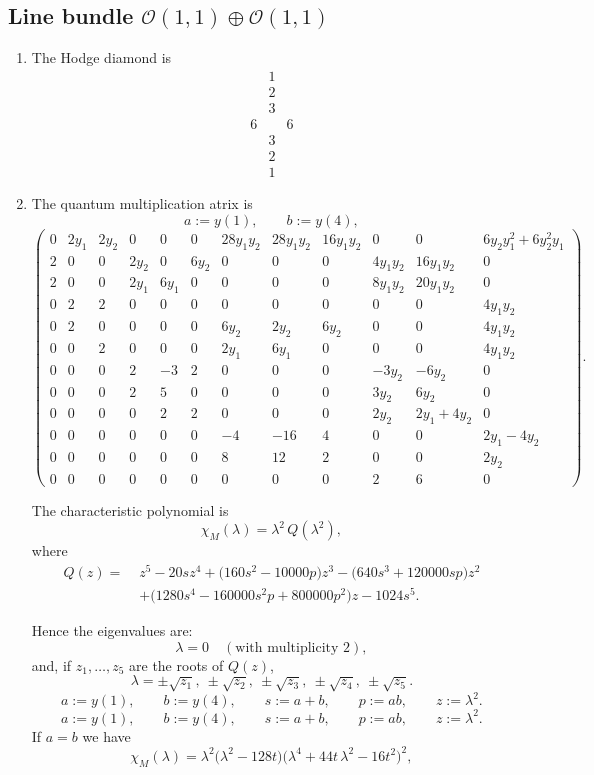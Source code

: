 \documentclass[11pt]{amsart}
\newcounter{num}[section] %
\begin{document}
\subsection{Line bundle $\mathcal{O}(1,1) \oplus \mathcal{O}(1,1)$}
\begin{enumerate}
    \item [1)] The Hodge diamond is
    \[
        \begin{array}{ccc}
             &1&  \\
             &2&\\
             &3&\\
             6&&6\\
             &3&\\
             &2&\\
             &1&
        \end{array}
    \]
\item[2)] The quantum multiplication atrix is
\[
a:=y(1),\qquad b:=y(4),
\]
\[
\begin{pmatrix}
0&2y_1&2y_2&0&0&0&28y_1 y_2&28y_1 y_2&16y_1 y_2&0&0&6y_2 y_1^2+6y_2^2 y_1\\
2&0&0&2y_2&0&6y_2&0&0&0&4y_1 y_2&16y_1 y_2&0\\
2&0&0&2y_1&6y_1&0&0&0&0&8y_1 y_2&20y_1 y_2&0\\
0&2&2&0&0&0&0&0&0&0&0&4y_1 y_2\\
0&2&0&0&0&0&6 y_2&2y_2&6y_2&0&0&4y_1 y_2\\
0&0&2&0&0&0&2 y_1&6 y_1&0&0&0&4y_1 y_2\\
0&0&0&2&-3&2&0&0&0&-3y_2&-6y_2&0\\
0&0&0&2&5&0&0&0&0&3y_2&6y_2&0\\
0&0&0&0&2&2&0&0&0&2y_2&2y_1+4y_2&0\\
0&0&0&0&0&0&-4&-16&4&0&0&2y_1-4y_2\\
0&0&0&0&0&0&8&12&2&0&0&2y_2\\
0&0&0&0&0&0&0&0&0&2&6&0
\end{pmatrix}.
\]

The characteristic polynomial is
\[
\chi_M(\lambda)=\lambda^2\,Q(\lambda^2),
\]
where
\[
\begin{aligned}
Q(z)=\;&z^5-20sz^4+\bigl(160s^2-10000p\bigr)z^3
-\bigl(640s^3+120000sp\bigr)z^2\\
&+\bigl(1280s^4-160000s^2p+800000p^2\bigr)z-1024s^5.
\end{aligned}
\]

Hence the eigenvalues are:
\[
\lambda=0 \quad (\text{with multiplicity }2),
\]
and, if \(z_1,\dots,z_5\) are the roots of \(Q(z)\),
\[
\lambda=\pm \sqrt{z_1},\ \pm \sqrt{z_2},\ \pm \sqrt{z_3},\ \pm \sqrt{z_4},\ \pm \sqrt{z_5}.
\]
\[
a:=y(1),\qquad b:=y(4),\qquad s:=a+b,\qquad p:=ab,\qquad z:=\lambda^2.
\]
\[
a:=y(1),\qquad b:=y(4),\qquad s:=a+b,\qquad p:=ab,\qquad z:=\lambda^2.
\]
If $a=b$ we have
\[
\chi_M(\lambda)=\lambda^2\bigl(\lambda^2-128t\bigr)\bigl(\lambda^4+44t\,\lambda^2-16t^2\bigr)^2,
\]


\end{enumerate}
\end{document}
